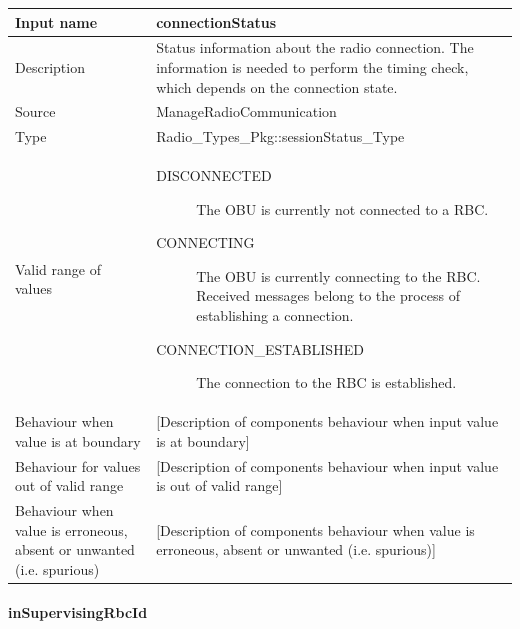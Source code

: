 \begin{longtable}{p{}p{}}
\toprule
Input name				& connectionStatus \\
\midrule
Description				& Status information about the radio connection. The information is needed to perform the timing check, which depends on the connection state. \\
\midrule
Source					& ManageRadioCommunication \\ 
\midrule
Type					& Radio\_Types\_Pkg::sessionStatus\_Type \\
\midrule
Valid range of values	& 
\begin{description}
\item[DISCONNECTED] The OBU is currently not connected to a RBC.
\item[CONNECTING] The OBU is currently connecting to the RBC. Received messages belong to the process of establishing a connection.
\item[CONNECTION\_ESTABLISHED] The connection to the RBC is established.
\end{description} \\
\midrule
Behaviour when value is at boundary	& [Description of components behaviour when input value is at boundary] \\
\midrule
Behaviour for values out of valid range	& [Description of components behaviour when input value is out of valid range] \\
\midrule
Behaviour when value is erroneous, absent or unwanted (i.e. spurious) & [Description of components behaviour when value is erroneous, absent or unwanted (i.e. spurious)] \\
\bottomrule
\end{longtable}


\paragraph{inSupervisingRbcId}

